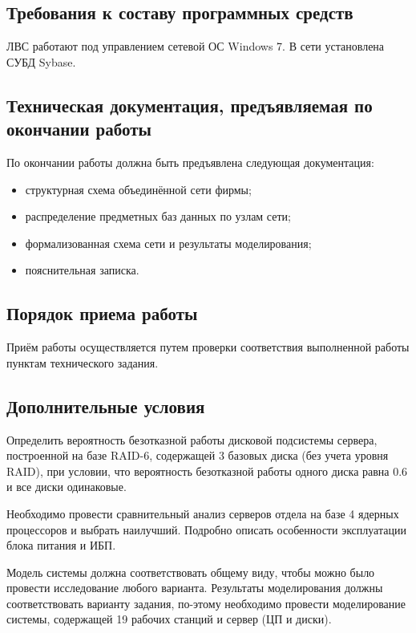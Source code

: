 \subsection{Требования к составу программных средств}

ЛВС работают под управлением сетевой ОС Windows 7. В сети установлена СУБД Sybase.

\subsection{Техническая документация, предъявляемая по окончании работы}

По окончании работы должна быть предъявлена следующая документация:
\begin{itemize}
\item структурная схема объединённой сети фирмы;
\item распределение предметных баз данных по узлам сети;
\item формализованная схема сети и результаты моделирования;
\item пояснительная записка.
\end{itemize}

\subsection{Порядок приема работы}

Приём работы осуществляется путем проверки соответствия выполненной работы пунктам технического задания.

\subsection{Дополнительные условия}

Определить вероятность безотказной работы дисковой подсистемы сервера, построенной на базе RAID-6, содержащей 3 базовых диска (без учета уровня RAID), при условии, что вероятность безотказной работы одного диска равна 0.6 и все диски одинаковые.\par\bigskip
 
Необходимо провести сравнительный анализ серверов отдела на базе 4 ядерных процессоров и выбрать наилучший. Подробно описать особенности эксплуатации блока питания и ИБП.\par\bigskip

Модель системы должна соответствовать общему виду, чтобы можно было провести исследование любого варианта. Результаты моделирования должны соответствовать варианту задания, по-этому необходимо провести моделирование системы, содержащей 19 рабочих станций и сервер (ЦП и диски).